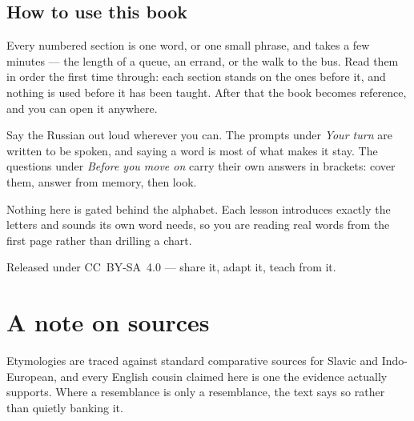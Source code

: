 \documentclass[11pt,twoside]{book}
\begin{document}
\section*{How to use this book}

Every numbered section is one word, or one small phrase, and takes a few
minutes --- the length of a queue, an errand, or the walk to the bus. Read them
in order the first time through: each section stands on the ones before it, and
nothing is used before it has been taught. After that the book becomes
reference, and you can open it anywhere.

Say the Russian out loud wherever you can. The prompts under \emph{Your turn}
are written to be spoken, and saying a word is most of what makes it stay. The
questions under \emph{Before you move on} carry their own answers in brackets:
cover them, answer from memory, then look.

Nothing here is gated behind the alphabet. Each lesson introduces exactly the
letters and sounds its own word needs, so you are reading real words from the
first page rather than drilling a chart.

Released under CC~BY-SA~4.0 --- share it, adapt it, teach from it.

\tableofcontents

\mainmatter



















\backmatter





\chapter*{A note on sources}

Etymologies are traced against standard comparative sources for Slavic and
Indo-European, and every English cousin claimed here is one the evidence
actually supports. Where a resemblance is only a resemblance, the text says so
rather than quietly banking it.


\end{document}
